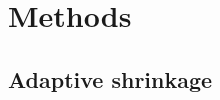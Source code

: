 \documentclass[12pt]{article}
\newcommand{\Gb}{\beta}
\newcommand{\s}{\sigma}
\begin{document}

\section{Methods}

\def\bY{\bm{Y}}
\def\bmu{\bm{\mu}}
\def\bp{\bm{p}}
\def\be{\bm{\epsilon}}
\def\tbY{\tilde\bY}
\def\tbe{\tilde\be}
\def\tbmu{\tilde\bmu}
\def\tmu{\tilde\mu}
\def\tY{\tilde{Y}}
\def\s{\sigma}
\def\|{\,|\,}

\subsection{Adaptive shrinkage}
\end{document}
